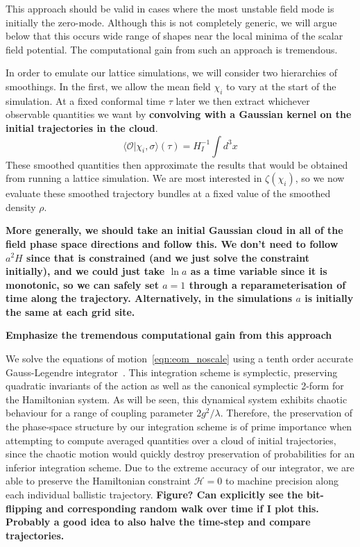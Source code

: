 This approach should be valid in cases where the most unstable field mode is initially the zero-mode.
Although this is not completely generic, we will argue below that this occurs wide range of shapes near the local minima of the scalar field potential.
The computational gain from such an approach is tremendous.

In order to emulate our lattice simulations, we will consider two hierarchies of smoothings.
In the first, we allow the mean field $\chi_i$ to vary at the start of the simulation.  At a fixed conformal time $\tau$ later we then extract whichever observable quantities we want by {\bf convolving with a Gaussian kernel on the initial trajectories in the cloud}.
\begin{equation}
  \langle\mathcal{O}|\chi_i,\sigma\rangle(\tau) = H_I^{-1}\int d^3x 
\end{equation}
These smoothed quantities then approximate the results that would be obtained from running a lattice simulation.
We are most interested in $\zeta(\chi_i)$, so we now evaluate these smoothed trajectory bundles at a fixed value of the smoothed density $\rho$.



    {\bf More generally, we should take an initial Gaussian cloud in all of the field phase space directions and follow this.  We don't need to follow $a^2H$ since that is constrained (and we just solve the constraint initially), and we could just take $\ln a$ as a time variable since it is monotonic, so we can safely set $a=1$ through a reparameterisation of time along the trajectory.  Alternatively, in the simulations $a$ is initially the same at each grid site.}

{\bf Emphasize the tremendous computational gain from this approach}

We solve the equations of motion~\eqref{eqn:eom_noscale} using a tenth order accurate Gauss-Legendre integrator~\cite{Butcher,Braden}.
This integration scheme is symplectic, preserving quadratic invariants of the action as well as the canonical symplectic 2-form for the Hamiltonian system.
As will be seen, this dynamical system exhibits chaotic behaviour for a range of coupling parameter $2g^2/\lambda$.
Therefore, the preservation of the phase-space structure by our integration scheme is of prime importance when attempting to compute averaged quantities over a cloud of initial trajectories,
since the chaotic motion would quickly destroy preservation of probabilities for an inferior integration scheme.
Due to the extreme accuracy of our integrator, we are able to preserve the Hamiltonian constraint $\mathcal{H}=0$ to machine precision along each individual ballistic trajectory.
{\bf Figure?  Can explicitly see the bit-flipping and corresponding random walk over time if I plot this.  Probably a good idea to also halve the time-step and compare trajectories.}

